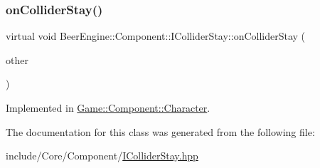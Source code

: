 \subsubsection{\texorpdfstring{on\+Collider\+Stay()}{onColliderStay()}}
{\footnotesize\ttfamily virtual void Beer\+Engine\+::\+Component\+::\+I\+Collider\+Stay\+::on\+Collider\+Stay (\begin{DoxyParamCaption}\item[{\mbox{\hyperlink{class_beer_engine_1_1_component_1_1_a_collider}{A\+Collider}} $\ast$}]{other }\end{DoxyParamCaption})\hspace{0.3cm}{\ttfamily [pure virtual]}}



Implemented in \mbox{\hyperlink{class_game_1_1_component_1_1_character_afdb1ebc07baa1a95840af9dfb48d9348}{Game\+::\+Component\+::\+Character}}.



The documentation for this class was generated from the following file\+:\begin{DoxyCompactItemize}
\item 
include/\+Core/\+Component/\mbox{\hyperlink{_i_collider_stay_8hpp}{I\+Collider\+Stay.\+hpp}}\end{DoxyCompactItemize}
